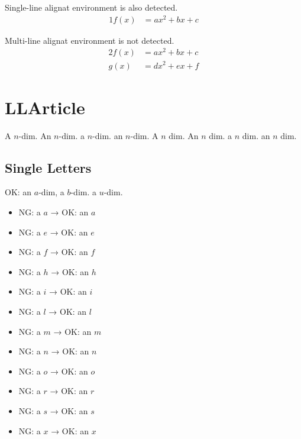 \documentclass[a4paper]{article}
\begin{document}
\vspace{\baselineskip}

Single-line alignat environment is also detected.
\begin{alignat*}{1}
	f(x) & = ax^2 + bx + c
\end{alignat*}

Multi-line alignat environment is not detected.
\begin{alignat*}{2}
	f(x) & = ax^2 + bx + c \\
	g(x) & = dx^2 + ex + f
\end{alignat*}


\section{LLArticle}

A $n$-dim. An $n$-dim. a $n$-dim. an $n$-dim.
A \(n\) dim. An \(n\) dim. a \(n\) dim. an \(n\) dim.

\subsection{Single Letters}

OK: an $a$-dim, a $b$-dim. a $u$-dim.

\vspace{0.5em}
\begin{minipage}{0.5\textwidth}
	\begin{itemize}
		\item NG: a $a$ → OK: an $a$
		\item NG: a $e$ → OK: an $e$
		\item NG: a $f$ → OK: an $f$
		\item NG: a $h$ → OK: an $h$
		\item NG: a $i$ → OK: an $i$
		\item NG: a $l$ → OK: an $l$
	\end{itemize}
\end{minipage}
\begin{minipage}{0.5\textwidth}
	\begin{itemize}
		\item NG: a $m$ → OK: an $m$
		\item NG: a $n$ → OK: an $n$
		\item NG: a $o$ → OK: an $o$
		\item NG: a $r$ → OK: an $r$
		\item NG: a $s$ → OK: an $s$
		\item NG: a $x$ → OK: an $x$
	\end{itemize}
\end{minipage}
\vspace{0.5em}
\end{document}
